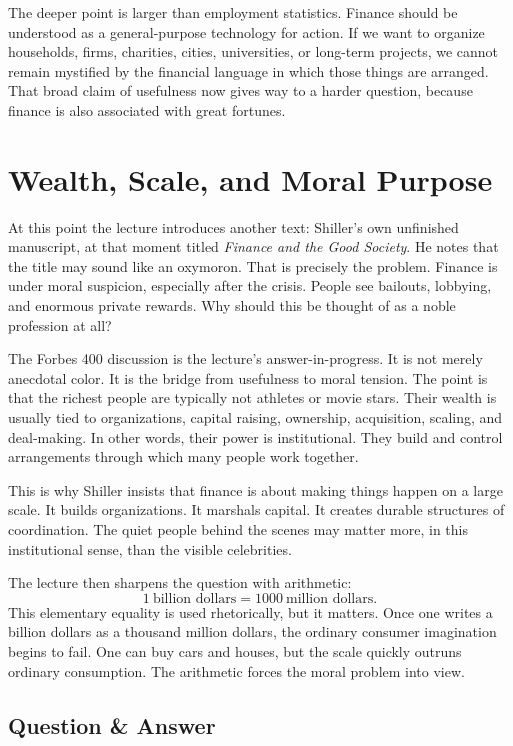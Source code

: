 The deeper point is larger than employment statistics. Finance should be understood as a general-purpose technology for action. If we want to organize households, firms, charities, cities, universities, or long-term projects, we cannot remain mystified by the financial language in which those things are arranged. That broad claim of usefulness now gives way to a harder question, because finance is also associated with great fortunes.

\section{Wealth, Scale, and Moral Purpose}

At this point the lecture introduces another text: Shiller's own unfinished manuscript, at that moment titled \emph{Finance and the Good Society}. He notes that the title may sound like an oxymoron. That is precisely the problem. Finance is under moral suspicion, especially after the crisis. People see bailouts, lobbying, and enormous private rewards. Why should this be thought of as a noble profession at all?

The Forbes 400 discussion is the lecture's answer-in-progress. It is not merely anecdotal color. It is the bridge from usefulness to moral tension. The point is that the richest people are typically not athletes or movie stars. Their wealth is usually tied to organizations, capital raising, ownership, acquisition, scaling, and deal-making. In other words, their power is institutional. They build and control arrangements through which many people work together.

This is why Shiller insists that finance is about making things happen on a large scale. It builds organizations. It marshals capital. It creates durable structures of coordination. The quiet people behind the scenes may matter more, in this institutional sense, than the visible celebrities.

The lecture then sharpens the question with arithmetic:
\begin{equation}
1\ \text{billion dollars}=1000\ \text{million dollars}.
\end{equation}
This elementary equality is used rhetorically, but it matters. Once one writes a billion dollars as a thousand million dollars, the ordinary consumer imagination begins to fail. One can buy cars and houses, but the scale quickly outruns ordinary consumption. The arithmetic forces the moral problem into view.

\subsection{Question \& Answer}

